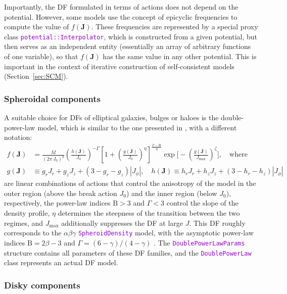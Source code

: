 \documentclass[12pt]{article}
\newcommand{\ttt}[1]{\textcolor{darkviolet}{\texttt{#1}}}
\newcommand{\bJ}{\boldsymbol{J}}
\newcommand{\Beta}{\mathrm B}
\begin{document}
Importantly, the DF formulated in terms of actions does not depend on the potential. However, some models use the concept of epicyclic frequencies to compute the value of $f(\bJ)$. These frequencies are represented by a special proxy class \ttt{potential::Interpolator}, which is constructed from a given potential, but then serves as an independent entity (essentially an array of arbitrary functions of one variable), so that $f(\bJ)$ has the same value in any other potential. This is important in the context of iterative construction of self-consistent models (Section~\ref{sec:SCM}).

\subsubsection{Spheroidal components}  \label{sec:DFspheroid}

A suitable choice for DFs of elliptical galaxies, bulges or haloes is the double-power-law model, which is similar to the one presented in \cite{Posti2015}, with a different notation:
\begin{align*}
f(\bJ) &= \frac{M}{(2\pi\, J_0)^3} \left(\frac{h(\bJ)}{J_0}\right)^{-\Gamma}
\left[1 + \left(\frac{g(\bJ)}{J_0}\right)^\eta \right]^{\frac{\Gamma-\Beta}{\eta}}
\exp\bigg[-\left(\frac{g(\bJ)}{J_\mathrm{max}}\right)^\zeta\bigg],  \quad\mbox{where} \\
g(\bJ) &\equiv g_r J_r + g_z J_z + (3-g_r-g_z) |J_\phi|, \quad
h(\bJ)  \equiv h_r J_r + h_z J_z + (3-h_r-h_z) |J_\phi|
\end{align*}
are linear combinations of actions that control the anisotropy of the model in the outer region (above the break action $J_0$) and the inner region (below $J_0$), respectively, the power-law indices $\Beta>3$ and $\Gamma<3$ control the slope of the density profile, $\eta$ determines the steepness of the transition between the two regimes, and $J_\mathrm{max}$ additionally suppresses the DF at large $J$. This DF roughly corresponds to the $\alpha\beta\gamma$ \ttt{SpheroidDensity} model, with the asymptotic power-law indices $\Beta=2\beta-3$ and $\Gamma=(6-\gamma)/(4-\gamma)$ . The \ttt{DoublePowerLawParams} structure contains all parameters of these DF families, and the \ttt{DoublePowerLaw} class represents an actual DF model.

\subsubsection{Disky components}  \label{sec:DFdisk}
\end{document}

